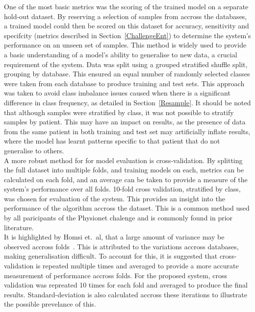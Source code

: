 \documentclass[titlepage, 12pt]{scrartcl} \usepackage{enumitem}
\begin{document}
One of the most basic metrics was the scoring of the trained model on a
separate hold-out dataset. By reserving a selection of samples from accross the
databases, a trained model could then be scored on this dataset for accuracy, sensitivity and
specifcity (metrics described in Section~\ref{ChallengeEnt}) to determine the
system's performance on an unseen set of samples. This method is widely used to
provide a basic understanding of a model's ability to generalise to new data, a
crucial requirement of the system. Data was split using a grouped stratified shuffle
split, grouping by database. This ensured an equal number of randomly selected
classes were taken from each database to produce training and test sets. This
approach was taken to avoid class imbalance issues caused when there is a
significant difference in class frequency, as detailed in
Section~\ref{Resample}. It should be noted that although samples were
stratified by class, it was not possible to stratify samples by patient. This
may have an impact on results, as the presence of data from the same patient in
both training and test set may artificially inflate results, where the model has
learnt patterns specific to that patient that do not generalise to others.\\

A more robust method for for model evaluation is cross-validation. By splitting
the full dataset into multiple folds, and training models on each, metrics can
be calculated on each fold, and an average can be taken to provide a measure of
the system's performance over all folds. 10-fold cross validation, stratified
by class, was chosen for evaluation of the system. This provides an insight
into the performance of the algorithm accross the dataset. This is a common
method used by all paricipants of the Physionet chalenge and is commonly found
in prior literature.\\
It is highlighted by Homsi et.\ al, that a large amount of variance may be
observed accross folds~\parencite[p.1637]{Homsi2017}. This is attributed to the
variations accross databases, making generalisation difficult. To account for
this, it is suggested that cross-validation is repeated multiple times and
averaged to provide a more accurate measurement of performance accross folds.
For the proposed system, cross validation was repreated 10 times for each fold
and averaged to produce the final results. Standard-deviation is also
calculated accross these iterations to illustrate the possible prevelance of
this.\\
\end{document}
